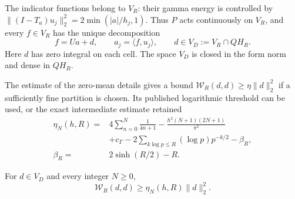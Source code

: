 The indicator functions belong to \(V_R\): their gamma energy is controlled by
\(\|(I-T_a)u_j\|_2^2=2\min(|a|/h_j,1)\). Thus \(P\) acts
continuously on \(V_R\), and every \(f\in V_R\) has the unique decomposition
\begin{equation}
f=Ua+d,\qquad a_j=\langle f,u_j\rangle,\qquad
d\in V_D:=V_R\cap QH_R.
\label{viii:schur-add-display-4}
\end{equation}
Here \(d\) has zero integral on each cell. The space \(V_D\) is
closed in the form norm and dense in \(QH_R\).

The estimate of the zero-mean details gives a bound \(\mathscr W_R(d,d)\geq\eta\|d\|_2^2\)
if a sufficiently fine partition is chosen. Its published
logarithmic threshold can be used, or the exact intermediate estimate retained
\begin{equation}
\begin{aligned}
\eta_N(h,R)={}&4\sum_{n=0}^N\frac1{4n+1}
-\frac{h^2(N+1)(2N+1)}{\pi^2}\\
&+c_\Gamma-2\sum_{k\log p\leq R}(\log p)p^{-k/2}-\beta_R,\\
\beta_R={}&2\sinh(R/2)-R.
\end{aligned}
\label{viii:schur-add-eq-S1}
\end{equation}
\begin{lemma}
\label{viii:schur-add-retencion-detalles}
For \(d\in V_D\) and every integer \(N\geq0\),
\[
\mathscr W_R(d,d)\geq\eta_N(h,R)\|d\|_2^2.
\]
\end{lemma}

